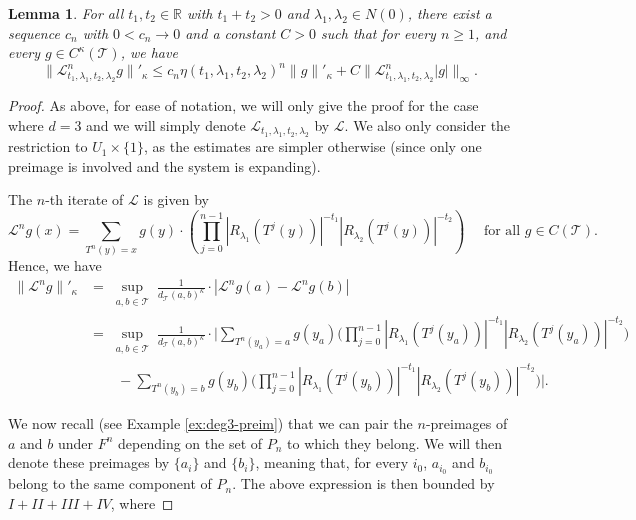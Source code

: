 \documentclass[11pt]{amsart}
\theoremstyle{plain}
\newtheorem{lem}[thm]{Lemma}
\theoremstyle{definition}
\theoremstyle{remark}
\begin{document}
\begin{lem}\label{l:L4MS}
For all 
$t_1,t_2 \in \mathbb R$ with $t_1+t_2>0$
and $\lambda_1,\lambda_2\in N(0)$,
there exist a sequence $c_n$ with $0 < c_n\to 0$ 
and a constant $C>0$ such that for
every $n\ge1$, and every $g \in C^{\kappa}(\mathcal T)$, 
we have
$$\|\mathcal L^n_{t_1,\lambda_1, t_2, \lambda_2}
g\|'_{\kappa} \le c_n
\eta(t_1,\lambda_1, t_2, \lambda_2)^n
\|g\|'_{\kappa} +C \|\mathcal L^n_{t_1,\lambda_1, t_2, \lambda_2}|g| \|_{\infty}.$$
\end{lem}

\begin{proof}
As above, for ease of notation, we will only give the proof for the case where $d=3$ and we will simply
denote $\mathcal L_{t_1, \lambda_1, t_2, \lambda_2}$
by $\mathcal L$.
We also only consider the restriction to $U_1 \times \{1\}$, as the estimates are simpler otherwise (since only one preimage is involved and the system is expanding).

\medskip

The $n$-th iterate of $\mathcal L$ is given by
\[
\mathcal{L}
^n g(x) = \sum_{T^n(y) = x} g(y) \cdot
\left(
\prod_{j=0}^{n-1}
|R_{\lambda_1}(T^{j}(y))|^{-t_1}
|R_{\lambda_2}(T^{j}(y))|^{-t_2}
\right)
\quad \mbox{ for all }
g \in C(\mathcal T).
\]
Hence, 
we have
\[
\begin{aligned}
\|\mathcal L^n
g\|'_{\kappa} &=
\sup_{\substack{a,b\in \mathcal T}}
\frac{1}{d_{\mathcal{T}}(a,b)^{\kappa}} \cdot|\mathcal L^n
g(a)-
\mathcal L^n
g(b)|\\
& =\sup_{\substack{a,b\in \mathcal T}}
\frac{1}{d_{\mathcal{T}}(a,b)^{\kappa}} \cdot
\Big|\sum_{T^n(y_a) = a}  g(y_a)
\Big(
\prod_{j=0}^{n-1}
|R_{\lambda_1}(T^{j}(y_a))|^{-t_1}
|R_{\lambda_2}(T^{j}(y_a))|^{-t_2}
\Big)
\\
& \quad  \quad -\sum_{T^n(y_b) = b} g(y_b)
\Big(
\prod_{j=0}^{n-1}
|R_{\lambda_1}(T^{j}(y_b))|^{-t_1}
|R_{\lambda_2}(T^{j}(y_b))|^{-t_2}
\Big)
\Big|.
\end{aligned}\]


We now recall (see Example \ref{ex:deg3-preim}) that we can pair the $n$-preimages of $a$ and $b$ under $F^n$
depending on the set of $P_n$ to which they belong. We will then denote these preimages by $\{a_i\}$ and $\{b_i\}$,
meaning that, for every $i_0$, $a_{i_0}$
and $b_{i_0}$ belong to the same component of $P_n$. The above expression is then bounded by $I+ II+III+IV$, where




\end{proof}
\end{document}
